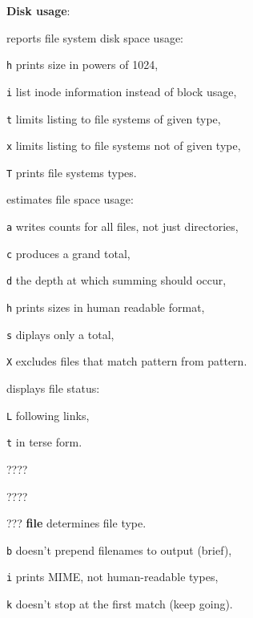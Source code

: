 \textbf{Disk usage}:
\begin{compactenum}
	\item [\symbolcoreutils]  reports file system disk space usage:
	\item [\texttt{h}] prints size in powers of 1024,
	\item [\texttt{i}] list inode information instead of block usage,
	\item [\texttt{t}] limits listing to file systems of given type,
	\item [\texttt{x}] limits listing to file systems not of given type,
	\item [\texttt{T}] prints file systems types.

	\item [\symbolcoreutils]  estimates file space usage:
	\item [\texttt{a}] writes counts for all files, not just directories,
	\item [\texttt{c}] produces a grand total,
	\item [\texttt{d}] the depth at which summing should occur,
	\item [\texttt{h}] prints sizes in human readable format,
	\item [\texttt{s}] diplays only a total,
	\item [\texttt{X}] excludes files that match pattern from pattern.

	\item [\symbolcoreutils]  displays file status:
	\item [\texttt{L}] following links,
	\item [\texttt{t}] in terse form.

	\item [\symbolcoreutils]  \dotfill ????

	\item [\symbolcoreutils]  \dotfill ????
\end{compactenum}

\begin{compactenum}
	\item [???] \textbf{file} determines file type.
	\item [\texttt{b}] doesn't prepend filenames to output (brief),
	\item [\texttt{i}] prints MIME, not human-readable types,
	\item [\texttt{k}] doesn't stop at the first match (keep going).
\end{compactenum}

